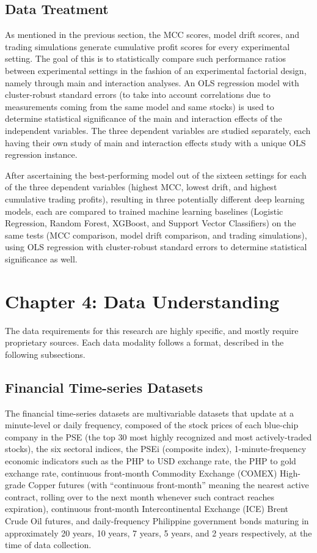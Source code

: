 \documentclass[stu,floatsintext]{apa7}
\begin{document}
\subsection{Data Treatment}

As mentioned in the previous section, the MCC scores, model drift scores, and trading simulations generate cumulative profit scores for every experimental setting. The goal of this is to statistically compare such performance ratios between experimental settings in the fashion of an experimental factorial design, namely through main and interaction analyses. An OLS regression model with cluster-robust standard errors (to take into account correlations due to measurements coming from the same model and same stocks) is used to determine statistical significance of the main and interaction effects of the independent variables. The three dependent variables are studied separately, each having their own study of main and interaction effects study with a unique OLS regression instance.

After ascertaining the best-performing model out of the sixteen settings for each of the three dependent variables (highest MCC, lowest drift, and highest cumulative trading profits), resulting in three potentially different deep learning models, each are compared to trained machine learning baselines (Logistic Regression, Random Forest, XGBoost, and Support Vector Classifiers) on the same tests (MCC comparison, model drift comparison, and trading simulations), using OLS regression with cluster-robust standard errors to determine statistical significance as well.

\clearpage
\section{Chapter 4: Data Understanding}

The data requirements for this research are highly specific, and mostly require proprietary sources. Each data modality follows a format, described in the following subsections.

\subsection{Financial Time-series Datasets}

The financial time-series datasets are multivariable datasets that update at a minute-level or daily frequency, composed of the stock prices of each blue-chip company in the PSE (the top 30 most highly recognized and most actively-traded stocks), the six sectoral indices, the PSEi (composite index), 1-minute-frequency economic indicators such as the PHP to USD exchange rate, the PHP to gold exchange rate, continuous front-month Commodity Exchange (COMEX) High-grade Copper futures (with ``continuous front-month'' meaning the nearest active contract, rolling over to the next month whenever such contract reaches expiration), continuous front-month Intercontinental Exchange (ICE) Brent Crude Oil futures, and daily-frequency Philippine government bonds maturing in approximately 20 years, 10 years, 7 years, 5 years, and 2 years respectively, at the time of data collection.
\end{document}
